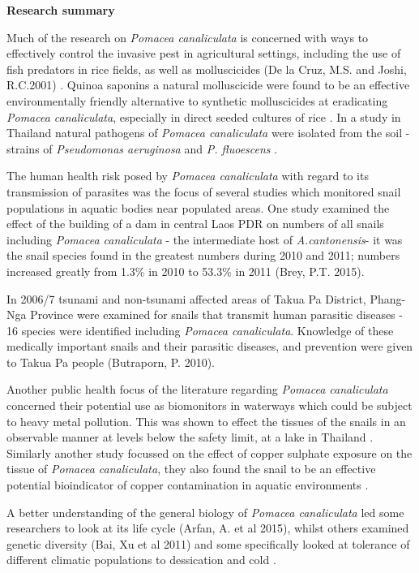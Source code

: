 \documentclass[]{book}
\theoremstyle{definition}
\theoremstyle{definition}
\theoremstyle{definition}
\theoremstyle{remark}
\begin{document}
\textbf{Research summary}

Much of the research on \emph{Pomacea canaliculata} is concerned with
ways to effectively control the invasive pest in agricultural settings,
including the use of fish predators in rice fields, as well as
molluscicides (De la Cruz, M.S. and Joshi, R.C.2001)
\citep{Su_Sin_2006}. Quinoa saponins a natural molluscicide were found
to be an effective environmentally friendly alternative to synthetic
molluscicides at eradicating \emph{Pomacea canaliculata}, especially in
direct seeded cultures of rice \citep{Joshi_2008}. In a study in
Thailand natural pathogens of \emph{Pomacea canaliculata} were isolated
from the soil - strains of \emph{Pseudomonas aeruginosa} and \emph{P.
fluoescens} \citep{Chobchuenchom_2003}.

The human health risk posed by \emph{Pomacea canaliculata} with regard
to its transmission of parasites was the focus of several studies which
monitored snail populations in aquatic bodies near populated areas. One
study examined the effect of the building of a dam in central Laos PDR
on numbers of all snails including \emph{Pomacea canaliculata} - the
intermediate host of \emph{A.cantonensis}- it was the snail species
found in the greatest numbers during 2010 and 2011; numbers increased
greatly from 1.3\% in 2010 to 53.3\% in 2011 (Brey, P.T. 2015).

In 2006/7 tsunami and non-tsunami affected areas of Takua Pa District,
Phang-Nga Province were examined for snails that transmit human
parasitic diseases - 16 species were identified including \emph{Pomacea
canaliculata}. Knowledge of these medically important snails and their
parasitic diseases, and prevention were given to Takua Pa people
(Butraporn, P. 2010).

Another public health focus of the literature regarding \emph{Pomacea
canaliculata} concerned their potential use as biomonitors in waterways
which could be subject to heavy metal pollution. This was shown to
effect the tissues of the snails in an observable manner at levels below
the safety limit, at a lake in Thailand \citep{Dummee_2012}. Similarly
another study focussed on the effect of copper sulphate exposure on the
tissue of \emph{Pomacea canaliculata}, they also found the snail to be
an effective potential bioindicator of copper contamination in aquatic
environments \citep{Dummee_2015}.

A better understanding of the general biology of \emph{Pomacea
canaliculata} led some researchers to look at its life cycle (Arfan, A.
et al 2015), whilst others examined genetic diversity (Bai, Xu et al
2011) and some specifically looked at tolerance of different climatic
populations to dessication and cold \citep{Wada_2011}.
\end{document}
